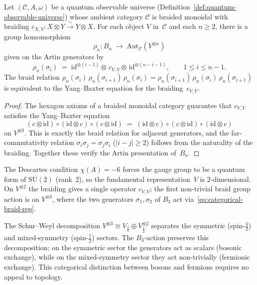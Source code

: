 \begin{proposition}
\label{prop:braid-action-tensor}
Let $(\mathcal{C}, A, \omega)$ be a quantum observable universe
(Definition~\ref{def:quantum-observable-universe}) whose ambient category
$\mathcal{C}$ is braided monoidal with braiding
$c_{X,Y}\colon X\otimes Y \xrightarrow{\;\sim\;} Y\otimes X$.
For each object $V$ in~$\mathcal{C}$ and each $n \geq 2$, there is a
group homomorphism
\[
  \rho_n\colon B_n \;\longrightarrow\; \mathrm{Aut}_{\mathcal{C}}(V^{\otimes n})
\]
given on the Artin generators by
\begin{equation}\label{eq:categorical-braid-rep}
  \rho_n(\sigma_i)
  \;=\;
  \mathrm{id}^{\otimes(i-1)}
  \otimes\, c_{V,V}
  \otimes\, \mathrm{id}^{\otimes(n-i-1)},
  \qquad 1 \leq i \leq n-1.
\end{equation}
The braid relation
$\rho_n(\sigma_i)\,\rho_n(\sigma_{i+1})\,\rho_n(\sigma_i)
= \rho_n(\sigma_{i+1})\,\rho_n(\sigma_i)\,\rho_n(\sigma_{i+1})$
is equivalent to the Yang--Baxter equation for the braiding~$c_{V,V}$.
\end{proposition}

\begin{proof}
The hexagon axioms of a braided monoidal category guarantee that
$c_{V,V}$ satisfies the Yang--Baxter equation
\[
  (c \otimes \mathrm{id})
  \circ (\mathrm{id} \otimes c)
  \circ (c \otimes \mathrm{id})
  \;=\;
  (\mathrm{id} \otimes c)
  \circ (c \otimes \mathrm{id})
  \circ (\mathrm{id} \otimes c)
\]
on $V^{\otimes 3}$.  This is exactly the braid relation for adjacent
generators, and the far-commutativity relation
$\sigma_i\sigma_j = \sigma_j\sigma_i$ ($\lvert i-j\rvert \geq 2$) follows
from the naturality of the braiding.  Together these verify the Artin
presentation of~$B_n$.
\end{proof}

\begin{remark}
\label{rem:why-B3}
The Descartes condition $\chi(A) = -6$ forces the gauge group to be a
quantum form of $\mathrm{SU}(2)$ (rank~$2$), so the fundamental
representation~$V$ is $2$-dimensional.  On $V^{\otimes 2}$ the braiding
gives a single operator $c_{V,V}$; the first non-trivial braid group
action is on $V^{\otimes 3}$, where the two generators $\sigma_1, \sigma_2$
of $B_3$ act via~\eqref{eq:categorical-braid-rep}.

The Schur--Weyl decomposition
$V^{\otimes 3} \cong V_{\frac{3}{2}} \oplus V_{\frac{1}{2}}^{\oplus 2}$
separates the symmetric (spin-$\frac{3}{2}$) and mixed-symmetry
(spin-$\frac{1}{2}$) sectors.  The $B_3$-action preserves this
decomposition: on the symmetric sector the generators act as scalars
(bosonic exchange), while on the mixed-symmetry sector they act
non-trivially (fermionic exchange).  This categorical distinction between
bosons and fermions requires no appeal to topology.
\end{remark}

